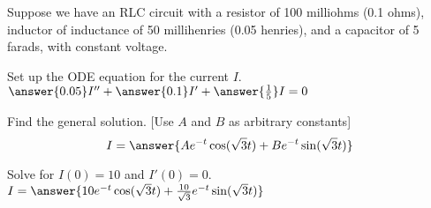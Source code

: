 \documentclass{ximera}
\begin{document}
\begin{exercise}%
    Suppose we have an RLC circuit with a resistor of 100 milliohms (0.1 ohms), inductor of inductance of 50 millihenries (0.05 henries), and a capacitor of 5 farads, with constant voltage.
    
    Set up the ODE equation for the current $I$. $\answer{0.05}I'' + \answer{0.1}I' + \answer{\frac{1}{5}} I = 0$
    \begin{problem}
        Find the general solution. [Use $A$ and $B$ as arbitrary constants]
        \[
            I = \answer{Ae^{-t}\cos(\sqrt{3} t) + Be^{-t}\sin(\sqrt{3} t)}
        \]
        \begin{problem}
            Solve for $I(0) = 10$ and $I'(0) = 0$. $I = \answer{10 e^{-t} \cos(\sqrt{3}  t) + \frac{10}{\sqrt{3}} e^{-t} \sin(\sqrt{3}  t)}$
        \end{problem}
    \end{problem}
\end{exercise}
\end{document}
